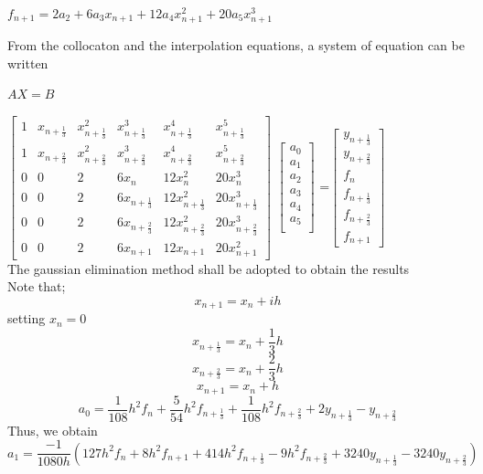 \documentclass[12pt]{article}
\begin{document}
\vspace{10pt}
$f_{n+1} = 2a_2 + 6a_3x_{n+1} + 12 a_4x_{n+1}^2 + 20a_5x^3_{n+1}$


\noindent From the collocaton and the interpolation equations, a system of equation can be written

\begin{center}
	$AX = B$
\end{center}



\vspace{20pt}


$\begin{bmatrix}
1 & x_{n+\frac{1}{3}} & x^{2}_{n+\frac{1}{3}} &  x^{3}_{n+\frac{1}{3}} & x^{4}_{n+\frac{1}{3}}& x^{5}_{n+\frac{1}{3}}\\
1 & x_{n+\frac{2}{3}} & x^{2}_{n+\frac{2}{3}} &  x^{3}_{n+\frac{2}{3}} & x^{4}_{n+\frac{2}{3}} & x^{5}_{n+\frac{2}{3}} \\
0&0 & 2 & 6x_n &  12x^2_{n} & 20x^{3}_{n} \\
0&0 & 2 & 6x_{n+\frac{1}{3}} &  12x^2_{n+\frac{1}{3}} & 20x^{3}_{n+\frac{1}{3}} \\
0&0 & 2 & 6x_{n+\frac{2}{3}} &  12x^2_{n+\frac{2}{3}} & 20x^{3}_{n+\frac{2}{3}} \\
0 & 0&2 & 6x_{n+1} &  12x_{n+1} & 20x^{2}_{n+1} 
\end{bmatrix}$
$\begin{bmatrix} a_{0}\\ a_{1} \\ a_{2} \\ a_{3}\\ a_{4}\\ a_{5}\\  \end{bmatrix}$
=$\begin{bmatrix} y_{n+\frac{1}{3}}\\ y_{n+\frac{2}{3}} \\ f_{n}\\ f_{n+\frac{1}{3}}\\ f_{n+\frac{2}{3}}\\ f_{n+1}
\end{bmatrix}$\\

\noindent The gaussian elimination method shall be adopted to obtain the results\\
Note that;
$$x_{n+1}=x_n+ih$$
setting $x_n=0$
$$x_{n+\frac{1}{3}}=x_n +\frac{1}{3}h$$
$$x_{n+\frac{2}{3}}=x_n +\frac{2}{3}h$$
$$x_{n+1}=x_n +h$$
$$a_0=\frac{1}{108}h^2f_n+\frac{5}{54}h^2f_{n+\frac{1}{3}}+\frac{1}{108}h^2f_{n+\frac{2}{3}}+2y_{n+\frac{1}{3}}-y_{n+\frac{2}{3}}$$
Thus, we obtain
$$a_1 = \frac{-1}{1080h}\left(127h^2f_n+8h^2f_{n+1}+414h^2f_{n+\frac{1}{3}}-9h^2f_{n+\frac{2}{3}}+3240y_{n+\frac{1}{3}}-3240y_{n+\frac{2}{3}}\right)$$
\end{document}
